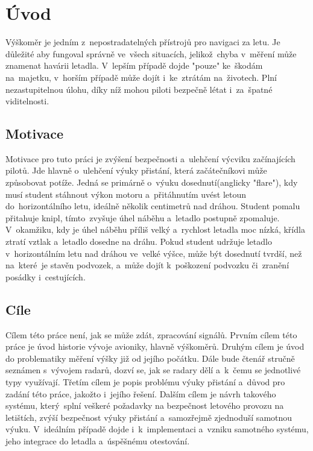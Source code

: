 
\newtheorem{definice}{Definice}

\chapter{Úvod}\label{uvod}
	Výškoměr je jedním z~nepostradatelných přístrojů pro navigaci za letu. Je důležité aby fungoval správně ve~všech situacích, jelikož~chyba v~měření může znamenat havárii letadla. V~lepším případě dojde "pouze" ke~škodám na~majetku, v~horším případě může dojít i~ke~ztrátám na~životech. Plní nezastupitelnou úlohu, díky níž mohou piloti bezpečně létat i~za~špatné viditelnosti.
	
	\section{Motivace}\label{uvod::motivace}
		Motivace pro tuto práci je zvýšení bezpečnosti a~ulehčení výcviku začínajících pilotů. Jde hlavně o~ulehčení výuky přistání, která začátečníkovi může způsobovat potíže. Jedná se primárně o~výuku dosednutí(anglicky "flare"), kdy musí student stáhnout výkon motoru a~přitáhnutím uvést letoun do~horizontálního letu, ideálně několik centimetrů nad dráhou. Student pomalu přitahuje knipl, tímto~zvyšuje úhel náběhu a~letadlo postupně zpomaluje. V~okamžiku, kdy je úhel náběhu příliš velký a~rychlost letadla moc nízká, křídla ztratí vztlak a~letadlo dosedne na dráhu. Pokud student udržuje letadlo v~horizontálním letu nad dráhou ve~velké výšce, může být dosednutí tvrdší, než na~které~je stavěn podvozek, a~může dojít k~poškození podvozku či~zranění posádky i~cestujících.
	
	\section{Cíle}\label{uvod::cile}
	Cílem této práce není, jak se může zdát, zpracování signálů. Prvním cílem této práce je úvod historie vývoje avioniky, hlavně výškoměrů. Druhým cílem je úvod do problematiky měření výšky již od jejího počátku. Dále bude čtenář stručně seznámen s~vývojem radarů, dozví se, jak se radary dělí a~k~čemu se jednotlivé typy využívají.
	Třetím cílem je popis problému výuky přistání a~důvod pro zadání této práce, jakožto i~jejího řešení. Dalším cílem je návrh takového systému, který~splní veškeré požadavky na bezpečnost letového provozu na letištích, zvýší bezpečnost výuky přistání a~samozřejmě zjednoduší samotnou výuku. V~ideálním případě dojde i~k~implementaci a~vzniku samotného systému, jeho integrace do letadla a~úspěšnému otestování.


